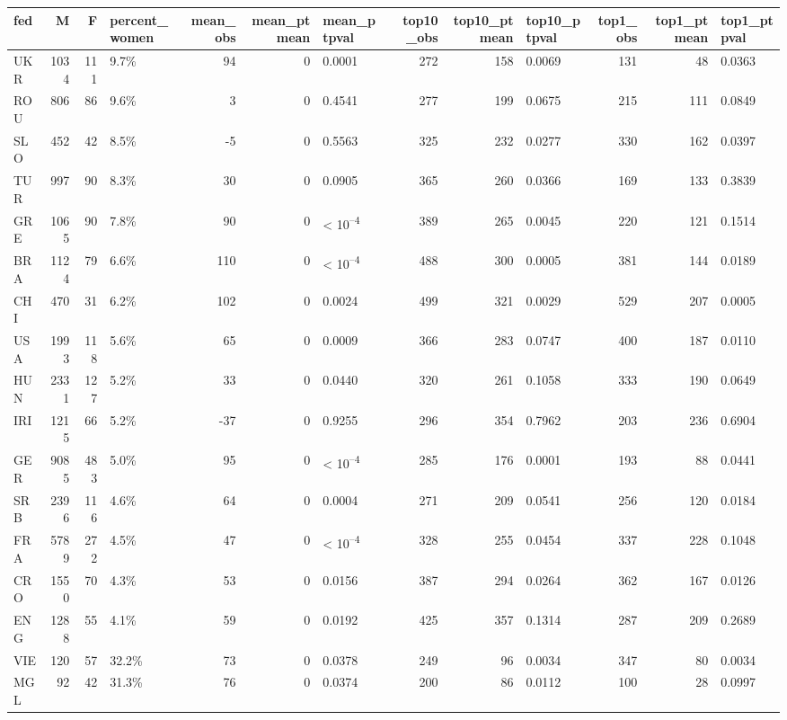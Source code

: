 
\begin{tabular}{l|r|r|l|r|r|l|r|r|l|r|r|l}
\hline
fed & M & F & percent_women & mean_obs & mean_ptmean & mean_ptpval & top10_obs & top10_ptmean & top10_ptpval & top1_obs & top1_ptmean & top1_ptpval\\
\hline
UKR & 1034 & 111 & 9.7\% & 94 & 0 & 0.0001 & 272 & 158 & 0.0069 & 131 & 48 & 0.0363\\
\hline
ROU & 806 & 86 & 9.6\% & 3 & 0 & 0.4541 & 277 & 199 & 0.0675 & 215 & 111 & 0.0849\\
\hline
SLO & 452 & 42 & 8.5\% & -5 & 0 & 0.5563 & 325 & 232 & 0.0277 & 330 & 162 & 0.0397\\
\hline
TUR & 997 & 90 & 8.3\% & 30 & 0 & 0.0905 & 365 & 260 & 0.0366 & 169 & 133 & 0.3839\\
\hline
GRE & 1065 & 90 & 7.8\% & 90 & 0 & < 10\textsuperscript{--4} & 389 & 265 & 0.0045 & 220 & 121 & 0.1514\\
\hline
BRA & 1124 & 79 & 6.6\% & 110 & 0 & < 10\textsuperscript{--4} & 488 & 300 & 0.0005 & 381 & 144 & 0.0189\\
\hline
CHI & 470 & 31 & 6.2\% & 102 & 0 & 0.0024 & 499 & 321 & 0.0029 & 529 & 207 & 0.0005\\
\hline
USA & 1993 & 118 & 5.6\% & 65 & 0 & 0.0009 & 366 & 283 & 0.0747 & 400 & 187 & 0.0110\\
\hline
HUN & 2331 & 127 & 5.2\% & 33 & 0 & 0.0440 & 320 & 261 & 0.1058 & 333 & 190 & 0.0649\\
\hline
IRI & 1215 & 66 & 5.2\% & -37 & 0 & 0.9255 & 296 & 354 & 0.7962 & 203 & 236 & 0.6904\\
\hline
GER & 9085 & 483 & 5.0\% & 95 & 0 & < 10\textsuperscript{--4} & 285 & 176 & 0.0001 & 193 & 88 & 0.0441\\
\hline
SRB & 2396 & 116 & 4.6\% & 64 & 0 & 0.0004 & 271 & 209 & 0.0541 & 256 & 120 & 0.0184\\
\hline
FRA & 5789 & 272 & 4.5\% & 47 & 0 & < 10\textsuperscript{--4} & 328 & 255 & 0.0454 & 337 & 228 & 0.1048\\
\hline
CRO & 1550 & 70 & 4.3\% & 53 & 0 & 0.0156 & 387 & 294 & 0.0264 & 362 & 167 & 0.0126\\
\hline
ENG & 1288 & 55 & 4.1\% & 59 & 0 & 0.0192 & 425 & 357 & 0.1314 & 287 & 209 & 0.2689\\
\hline
VIE & 120 & 57 & 32.2\% & 73 & 0 & 0.0378 & 249 & 96 & 0.0034 & 347 & 80 & 0.0034\\
\hline
MGL & 92 & 42 & 31.3\% & 76 & 0 & 0.0374 & 200 & 86 & 0.0112 & 100 & 28 & 0.0997\\

\end{tabular}
